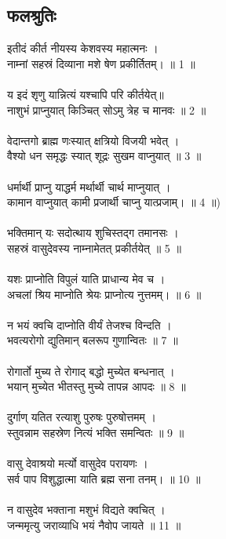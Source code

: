 \subsection{फलश्रुतिः}
इतीदं कीर्त नीयस्य केशवस्य महात्मनः ।\\
नाम्नां सहस्रं दिव्याना मशे षेण प्रकीर्तितम्। ॥ 1 ॥\\
\\
य इदं शृणु यान्नित्यं यश्चापि परि कीर्तयेत्॥\\
नाशुभं प्राप्नुयात् किञ्चित् सोऽमु त्रेह च मानवः ॥ 2 ॥\\
\\
वेदान्तगो ब्राह्म णःस्यात् क्षत्रियो विजयी भवेत् ।\\
वैश्यो धन समृद्धः स्यात् शूद्रः सुखम वाप्नुयात् ॥ 3 ॥\\
\\
धर्मार्थी प्राप्नु याद्धर्म मर्थार्थी चार्थ माप्नुयात् ।\\
कामान वाप्नुयात् कामी प्रजार्थी चाप्नु यात्प्रजाम्। ॥ 4 ॥)\\
\\
भक्तिमान् यः सदोत्थाय शुचिस्तद्ग तमानसः ।\\
सहस्रं वासुदेवस्य नाम्नामेतत् प्रकीर्तयेत् ॥ 5 ॥\\
\\
यशः प्राप्नोति विपुलं याति प्राधान्य मेव च ।\\
अचलां श्रिय माप्नोति श्रेयः प्राप्नोत्य नुत्तमम्। ॥ 6 ॥\\
\\
न भयं क्वचि दाप्नोति वीर्यं तेजश्च विन्दति ।\\
भवत्यरोगो द्युतिमान् बलरूप गुणान्वितः ॥ 7 ॥\\
\\
रोगार्तो मुच्य ते रोगाद् बद्धो मुच्येत बन्धनात् ।\\
भयान् मुच्येत भीतस्तु मुच्ये तापन्न आपदः ॥ 8 ॥\\
\\
दुर्गाण् यतित रत्याशु पुरुषः पुरुषोत्तमम् ।\\
स्तुवन्नाम सहस्रेण नित्यं भक्ति समन्वितः ॥ 9 ॥\\
\\
वासु देवाश्रयो मर्त्यो वासुदेव परायणः ।\\
सर्व पाप विशुद्धात्मा याति ब्रह्म सना तनम्। ॥ 10 ॥\\
\\
न वासुदेव भक्ताना मशुभं विद्यते क्वचित् ।\\
जन्ममृत्यु जराव्याधि भयं नैवोप जायते ॥ 11 ॥\\
\\
